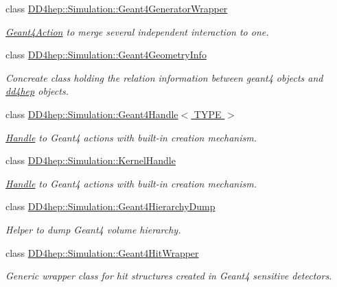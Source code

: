 \begin{DoxyCompactItemize}
class \hyperlink{class_d_d4hep_1_1_simulation_1_1_geant4_generator_wrapper}{DD4hep::Simulation::Geant4GeneratorWrapper}
\begin{DoxyCompactList}\small\item\em \hyperlink{class_d_d4hep_1_1_simulation_1_1_geant4_action}{Geant4Action} to merge several independent interaction to one. \item\end{DoxyCompactList}\item 
class \hyperlink{class_d_d4hep_1_1_simulation_1_1_geant4_geometry_info}{DD4hep::Simulation::Geant4GeometryInfo}
\begin{DoxyCompactList}\small\item\em Concreate class holding the relation information between geant4 objects and \hyperlink{namespacedd4hep}{dd4hep} objects. \item\end{DoxyCompactList}\item 
class \hyperlink{class_d_d4hep_1_1_simulation_1_1_geant4_handle}{DD4hep::Simulation::Geant4Handle$<$ TYPE $>$}
\begin{DoxyCompactList}\small\item\em \hyperlink{class_d_d4hep_1_1_handle}{Handle} to Geant4 actions with built-\/in creation mechanism. \item\end{DoxyCompactList}\item 
class \hyperlink{class_d_d4hep_1_1_simulation_1_1_kernel_handle}{DD4hep::Simulation::KernelHandle}
\begin{DoxyCompactList}\small\item\em \hyperlink{class_d_d4hep_1_1_handle}{Handle} to Geant4 actions with built-\/in creation mechanism. \item\end{DoxyCompactList}\item 
class \hyperlink{class_d_d4hep_1_1_simulation_1_1_geant4_hierarchy_dump}{DD4hep::Simulation::Geant4HierarchyDump}
\begin{DoxyCompactList}\small\item\em Helper to dump Geant4 volume hierarchy. \item\end{DoxyCompactList}\item 
class \hyperlink{class_d_d4hep_1_1_simulation_1_1_geant4_hit_wrapper}{DD4hep::Simulation::Geant4HitWrapper}
\begin{DoxyCompactList}\small\item\em Generic wrapper class for hit structures created in Geant4 sensitive detectors. \item\end{DoxyCompactList}\item 

\end{DoxyCompactItemize}
